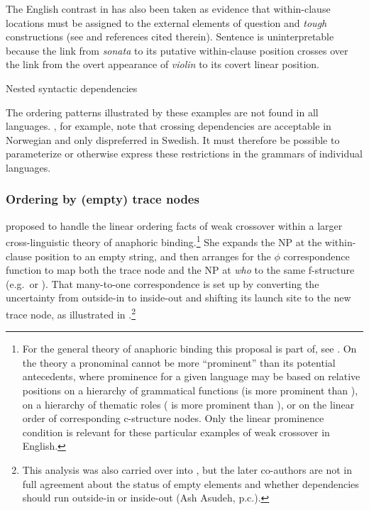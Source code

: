 \documentclass[output=paper,hidelinks]{langscibook}
\begin{document}
\noindent  The English contrast in  has also been taken as evidence that within-clause locations must be assigned to the external elements of question and \textit{tough} constructions  (see \citet{kaplanbresnan82} and references cited therein).  Sentence  is uninterpretable because the link from \textit{sonata} to its putative within-clause position crosses over the link from the overt appearance of \textit{violin} to its covert linear position.

\ea\label{sonatatrace}Nested syntactic dependencies %
\label{badsonata}
\z\z

\noindent The ordering patterns illustrated by these examples are not found in all languages.  \citet{MalingZaenen1982}, for example, note that crossing dependencies are acceptable in Norwegian and only dispreferred in Swedish. It must therefore be possible to parameterize or otherwise express these restrictions in the grammars of individual languages.

\subsubsection{Ordering by (empty) trace nodes}

\citet{bresnan2001lexical} proposed to handle the linear ordering facts of weak crossover within a larger cross-linguistic theory of anaphoric binding.\footnote{For the general theory of anaphoric binding this proposal is part of, see . On the \citet{bresnan2001lexical} theory a pronominal cannot be more ``prominent'' than its potential antecedents, where prominence for a given language may be based on relative positions on a hierarchy of grammatical functions (\SUBJ is more prominent than \OBJ), on a hierarchy of thematic roles ( is more prominent than ), or on the linear order of corresponding c-structure nodes. Only the linear prominence condition is relevant for these particular examples of weak crossover in English.}  She expands the NP at the within-clause position to an empty string, and then arranges for the $\phi$ correspondence function to map both the trace node and the NP at \textit{who} to the same f-structure (e.g.\ \OBJ or \OBLTHETA). That many-to-one correspondence is set up by converting the uncertainty from outside-in to inside-out and shifting its launch site to the new trace node, as illustrated in .\footnote{This analysis was also carried over into \citet{BresnanEtAl2016}, but the later co-authors are not in full agreement about the status of empty elements and whether dependencies should run outside-in or inside-out (Ash Asudeh, p.c.).}   
\end{document}
